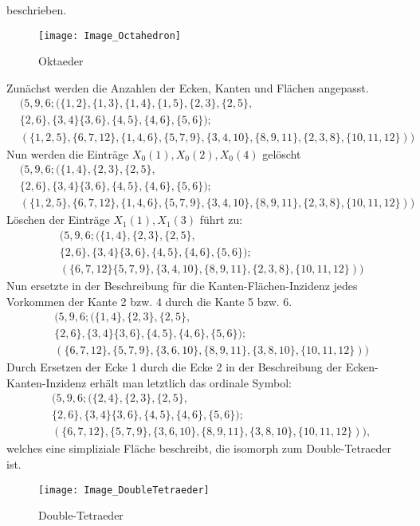 \documentclass[12pt,titlepage,twoside,cleardoublepage]{article}
\theoremstyle{nummermitklammern}
\numberwithin{equation}{section}
\begin{document}
 beschrieben. 
\begin{figure}[H]
\begin{center}
\texttt{[image: Image\_Octahedron]}
\end{center}
\caption{Oktaeder}
\end{figure} 
 Zunächst werden die Anzahlen der Ecken, Kanten und Flächen angepasst.
 \begin{align*}
 &(5,9,6;(\{1,2\},\{1,3\},\{1,4\},\{1,5\},\{2,3\},\{2,5\},\\
 &\{2,6\},\{3,4\}\{3,6\},\{4,5\},\{4,6\},\{5,6\});\\
 &(\{1,2,5\},\{6,7,12\},\{1,4,6\},\{5,7,9\},\{3,4,10\},\{8,9,11\},\{2,3,8\},\{10,11,12\}))
 \end{align*}
 Nun werden die Einträge $X_0(1),X_0(2),X_0(4)$ gelöscht 
 \begin{align*}
 &(5,9,6;(\{1,4\},\{2,3\},\{2,5\},\\
 &\{2,6\},\{3,4\}\{3,6\},\{4,5\},\{4,6\},\{5,6\});\\
 &(\{1,2,5\},\{6,7,12\},\{1,4,6\},\{5,7,9\},\{3,4,10\},\{8,9,11\},\{2,3,8\},\{10,11,12\}))
 \end{align*}
 Löschen der Einträge $X_1(1),X_1(3)$ führt zu:
\begin{align*}
 &(5,9,6;(\{1,4\},\{2,3\},\{2,5\},\\
 &\{2,6\},\{3,4\}\{3,6\},\{4,5\},\{4,6\},\{5,6\});\\
 &(\{6,7,12\}\{5,7,9\},\{3,4,10\},\{8,9,11\},\{2,3,8\},\{10,11,12\}))
 \end{align*} 
 Nun ersetzte in der Beschreibung für die Kanten-Flächen-Inzidenz jedes Vorkommen der Kante 2 bzw. 4 durch die Kante 5 bzw. 6.
 \begin{align*}
 &(5,9,6;(\{1,4\},\{2,3\},\{2,5\},\\
 &\{2,6\},\{3,4\}\{3,6\},\{4,5\},\{4,6\},\{5,6\});\\
 &(\{6,7,12\},\{5,7,9\},\{3,6,10\},\{8,9,11\},\{3,8,10\},\{10,11,12\}))
 \end{align*}
 Durch Ersetzen der Ecke 1 durch die Ecke 2 in der Beschreibung der Ecken-Kanten-Inzidenz erhält man letztlich das ordinale Symbol:
 \begin{align*}
 &(5,9,6;(\{2,4\},\{2,3\},\{2,5\},\\
 &\{2,6\},\{3,4\}\{3,6\},\{4,5\},\{4,6\},\{5,6\});\\
 &(\{6,7,12\},\{5,7,9\},\{3,6,10\},\{8,9,11\},\{3,8,10\},\{10,11,12\})),
 \end{align*}
 welches eine simpliziale Fläche beschreibt, die isomorph zum Double-Tetraeder ist.
 \begin{figure}[H]
\begin{center}
\texttt{[image: Image\_DoubleTetraeder]}
\end{center}
\caption{Double-Tetraeder}
\end{figure}
\end{document}
